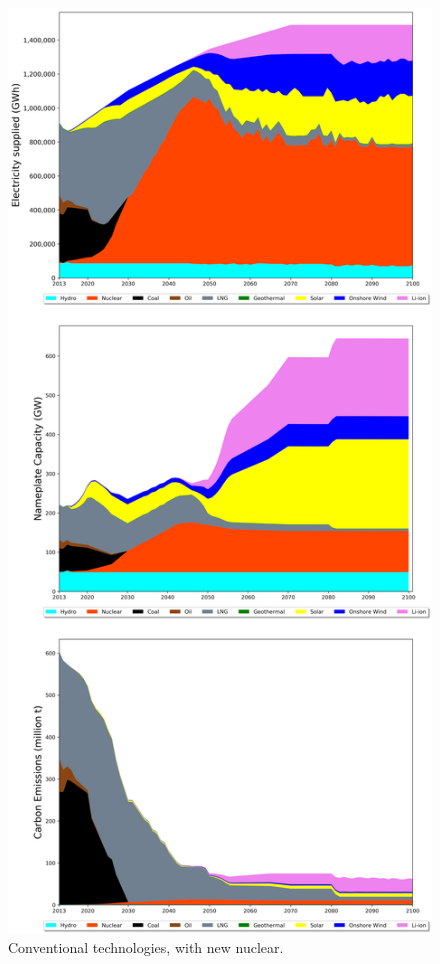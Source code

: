 \begin{figure}[h] 
\centering
\vspace*{-3cm}
\includegraphics[scale=0.42]{figures/conv_nuc}
\caption{Conventional technologies, with new nuclear.}
\label{scen2}
\end{figure}

